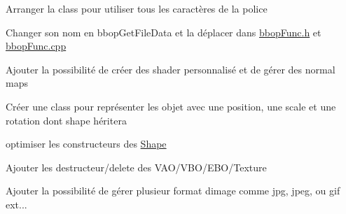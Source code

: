 
\begin{DoxyRefList}
\item[Member \mbox{\hyperlink{classFont_a41a7dca42ac0df85a27163dc9ace9de3}{Font\+::Font}} (int glyph\+Size, const char $\ast$ttf\+Path)]\label{todo__todo000002}%
%
Arranger la class pour utiliser tous les caractères de la police  
\item[Member \mbox{\hyperlink{bbopGlobal_8cpp_abad8b4d4b0f318cf85947bef83f84526}{get\+File\+Data}} (const char $\ast$filename)]\label{todo__todo000001}%
%
Changer son nom en bbop\+Get\+File\+Data et la déplacer dans \mbox{\hyperlink{bbopFunc_8h}{bbop\+Func.\+h}} et \mbox{\hyperlink{bbopFunc_8cpp}{bbop\+Func.\+cpp}}  
\item[Class \mbox{\hyperlink{classScene}{Scene}} ]\label{todo__todo000003}%
%
Ajouter la possibilité de créer des shader personnalisé et de gérer des normal maps  
\item[Class \mbox{\hyperlink{classShape}{Shape}} ]\label{todo__todo000004}%
%
Créer une class pour représenter les objet avec une position, une scale et une rotation dont shape héritera 

optimiser les constructeurs des \mbox{\hyperlink{classShape}{Shape}} 

Ajouter les destructeur/delete des VAO/\+VBO/\+EBO/\+Texture  
\item[Class \mbox{\hyperlink{classTexture}{Texture}} ]\label{todo__todo000005}%
%
Ajouter la possibilité de gérer plusieur format d\textquotesingle{}image comme jpg, jpeg, ou gif ext... 
\end{DoxyRefList}